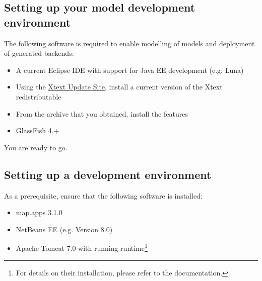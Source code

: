 
\subsection{Setting up your \MD model development environment}

The following software is required to enable modelling of \MD models and deployment of generated backends:

\begin{itemize}
\item A current Eclipse IDE with support for Java EE development (e.g. Luna)
\item Using the \href{https://eclipse.org/Xtext/download.html}{Xtext Update Site}, install a current version of the Xtext redistributable
\item From the archive that you obtained, install the \MD features
\item GlassFish 4.+
\end{itemize}

You are ready to go.


\subsection{Setting up a \mapapps development environment}

As a prerequisite, ensure that the following software is installed:

\begin{itemize}
\item map.apps 3.1.0
\item NetBeans EE (e.g. Version 8.0)
\item Apache Tomcat 7.0 with running \mapapps runtime\footnote{For details on their installation, please refer to the \mapapps documentation.}
\end{itemize}

